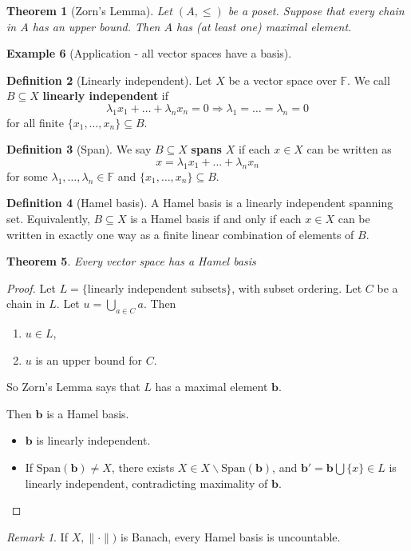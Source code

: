 \documentclass[10pt, oneside, reqno]{amsart}
\theoremstyle{plain}%
\newtheorem{thm}{Theorem}[section]
\theoremstyle{definition}
\newtheorem{defn}[thm]{Definition}
\newtheorem{exmp}[thm]{Example}
\theoremstyle{remark}
\newtheorem*{rem}{Remark}
\newcommand{\F}{\mathbb{F}}
\begin{document}
\begin{thm}[Zorn's Lemma]
    Let $(A, \leq)$ be a poset.  Suppose that every chain in $A$ has an upper bound.  Then $A$ has (at least one) maximal element.  
\end{thm}

\begin{exmp}[Application - all vector spaces have a basis]
    \begin{defn}[Linearly independent]
        Let $X$ be a vector space over $\F$.  We call $B \subseteq X$ \textbf{linearly independent} if \[
            \lambda_1 x_1 + \dots + \lambda_n x_n = 0 \Rightarrow \lambda_1 = \dots = \lambda_n = 0
        \] for all finite $\{ x_1, \dots, x_n \} \subseteq B$. 
    \end{defn}
    
    \begin{defn}[Span]
        We say $B \subseteq X$ \textbf{spans} $X$ if each $x \in X$ can be written as \[
            x = \lambda_1 x_1 + \dots + \lambda_n x_n
        \] for some $\lambda_1, \dots, \lambda_n \in \F$ and $\{ x_1, \dots, x_n \} \subseteq B$. 
    \end{defn}
    
    \begin{defn}[Hamel basis]
        A Hamel basis is a linearly independent spanning set. Equivalently, $B \subseteq X$ is a Hamel basis if and only if each $x \in X$ can be written in exactly one way as a finite linear combination of elements of $B$.
    \end{defn}
    
    \begin{thm}
        Every vector space has a Hamel basis
    \end{thm}
    
    \begin{proof}
        Let $L = \{ \text{linearly independent subsets} \}$, with subset ordering.  Let $C$ be a chain in $L$.  Let $u = \bigcup_{a \in C} a$.  Then 
        \begin{enumerate}[(1)]
            \item $u \in L$,
            \item $u$ is an upper bound for $C$.
        \end{enumerate}  
        So Zorn's Lemma says that $L$ has a maximal element $\mathbf{b}$.  
        
        Then $\mathbf{b}$ is a Hamel basis. 
        \begin{itemize}
            \item $\mathbf{b}$ is linearly independent.  
            \item If $\text{Span}(\mathbf{b}) \neq X$, there exists $X \in X \backslash \text{Span}(\mathbf{b})$, and $\mathbf{b'} = \mathbf{b} \bigcup \{ x \} \in L$ is linearly independent, contradicting maximality of $\mathbf{b}$.
        \end{itemize}  
    \end{proof}
    
    \begin{rem}
        If $ X, \| \cdot \| )$ is Banach, every Hamel basis is uncountable.
    \end{rem}
\end{exmp}
\end{document}
